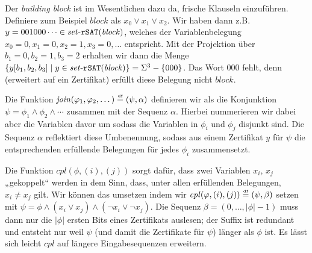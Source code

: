 Der \emph{building block} ist im Wesentlichen dazu da, frische Klauseln einzuführen. Definiere zum Beispiel $\mathit{block}$ als $x_0\lor x_1\lor x_2$. Wir haben dann z.B. $y=001000\cdots\in\mathit{set}\text{-}{}\mathtt{rSAT}(\mathit{block})$, welches der Variablenbelegung $x_0=0,x_1=0,x_2=1,x_3=0,\ldots$ entspricht. Mit der Projektion über $b_1=0,b_2=1,b_3=2$ erhalten wir dann die Menge $\{ y[b_1,b_2,b_3] \mid y\in\mathit{set}\text{-}\mathtt{rSAT}(\mathit{block})\} = \Sigma^3-\{000\}$. Das Wort $000$ fehlt, denn (erweitert auf ein Zertifikat) erfüllt diese Belegung nicht $\mathit{block}$.

Die Funktion $\mathit{join}(\varphi_1, \varphi_2, \dots)\stackrel{\text{\smash{\tiny df}}}{=}(\psi,\alpha)$ definieren wir als die Konjunktion $\psi=\phi_1\land\phi_2\land\cdots$ zusammen mit der Sequenz $\alpha$. Hierbei nummerieren wir dabei aber die Variablen davor um sodass die Variablen in $\phi_i$ und $\phi_j$ disjunkt sind. Die Sequenz $\alpha$ reflektiert diese Umbenennung, sodass aus einem Zertifikat $y$ für $\psi$ die entsprechenden erfüllende Belegungen für jedes $\phi_i$ zusammensetzt.

Die Funktion $\mathit{cpl}(\phi, (i), (j))$ sorgt dafür, dass zwei Variablen $x_i$, $x_j$ „gekoppelt“ werden in dem Sinn, dass, unter allen erfüllenden Belegungen, $x_i\neq x_j$ gilt. Wir können das umsetzen indem wir $\mathit{cpl}(\varphi, (i), (j))\stackrel{\text{\smash{\tiny df}}}{=}(\psi, \beta)$ setzen mit $\psi=\phi\land (x_i\lor x_j) \land (\neg x_i\lor \neg x_j)$. Die Sequenz $\beta=(0,\dots,|\phi|-1)$ muss dann nur die $|\phi|$ ersten Bits eines Zertifikats auslesen; der Suffix ist redundant und entsteht nur weil $\psi$ (und damit die Zertifikate für $\psi$) länger als $\phi$ ist. Es lässt sich leicht $\mathit{cpl}$ auf längere Eingabesequenzen erweitern.

